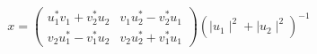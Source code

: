 \begin{equation}
x= \left(
\begin{array}{cc}
u_{1}^{\ast} v_{1}+v_{2}^{\ast} u_{2}& v_{1}u_{2}^{\ast}-v_{2}^{\ast}u_{1}\\
v_{2}u_{1}^{\ast}-v_{1}^{\ast}u_{2} & v_{2}u_{2}^{\ast}+v_{1}^{\ast}u_{1}
\end{array}
\right) (\mid u_{1}\mid^{2}+\mid u_{2}\mid^{2})^{-1}
\end{equation}

